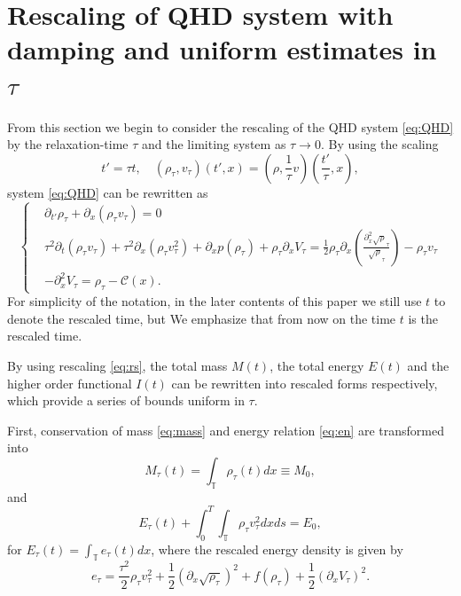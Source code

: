 \documentclass[leqno]{amsart}
\theoremstyle{plain}
\theoremstyle{definition}
\theoremstyle{remark}
\theoremstyle{plain}
\theoremstyle{plain}
\def\T{{\mathbb T}}%
\def\d{{\partial}}
\numberwithin{equation}{section}
\begin{document}
\section{Rescaling of QHD system with damping and uniform estimates in $\tau$}\label{sect:rs}

From this section we begin to consider the rescaling of the QHD system \eqref{eq:QHD} by the relaxation-time $\tau$ and the limiting system as $\tau\to 0$. By using the scaling
\begin{equation}\label{eq:rs}
t'=\tau t,\quad (\rho_\tau,v_\tau)(t',x)=\left(\rho,\frac{1}{\tau}v\right)\left(\frac{t'}{\tau},x\right),
\end{equation}
system \eqref{eq:QHD} can be rewritten as
\begin{equation}\label{eq:QHD_rs}
\left\{\begin{aligned}
&\d_{t'}\rho_\tau+\d_x (\rho_\tau v_\tau)=0\\
&\tau^2\d_t (\rho_\tau v_\tau)+\tau^2\d_x(\rho_\tau v_\tau^2)+\d_x p(\rho_\tau)+\rho_\tau\d_x V_\tau=\frac{1}{2}\rho_\tau\d_x\left(\frac{\d_x^2\sqrt\rho_\tau}{\sqrt\rho_\tau}\right)-\rho_\tau v_\tau\\
&-\d_x^2V_\tau=\rho_\tau-\mathcal{C}(x).
\end{aligned}\right.
\end{equation}
For simplicity of the notation, in the later contents of this paper we still use $t$ to denote the rescaled time, but We emphasize that from now on the time $t$ is the rescaled time.

By using rescaling \eqref{eq:rs}, the total mass $M(t)$, the total energy $E(t)$ and the higher order functional $I(t)$ can be rewritten into rescaled forms respectively, which provide a series of bounds uniform in $\tau$.

First, conservation of mass \eqref{eq:mass} and energy relation \eqref{eq:en} are transformed into
\begin{equation}\label{eq:M_rs}
M_\tau(t)=\int_\T \rho_\tau(t)dx\equiv M_0,
\end{equation}
and
\begin{equation}\label{eq:en_rs}
E_\tau(t)+\int_0^T\int_\T \rho_\tau v_\tau^2dxds=E_0,
\end{equation}
for $E_\tau(t)=\int_\T e_\tau(t)dx$, where the rescaled energy density is given by
\begin{equation}\label{eq:endens_rs}
e_\tau=\frac{\tau^2}{2}\rho_\tau v_\tau^2+\frac12(\d_x\sqrt{\rho_\tau})^2+f(\rho_\tau)+\frac12(\d_xV_\tau)^2.
\end{equation}
\end{document}
